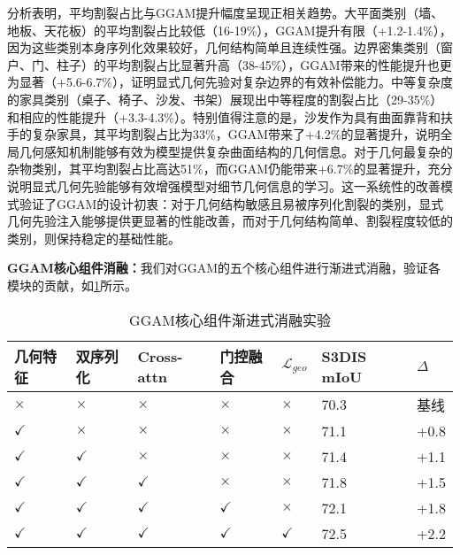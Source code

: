 \documentclass[preprint,12pt]{elsarticle}
\begin{document}
分析表明，平均割裂占比与GGAM提升幅度呈现正相关趋势。大平面类别（墙、地板、天花板）的平均割裂占比较低（16-19\%），GGAM提升有限（+1.2-1.4\%），因为这些类别本身序列化效果较好，几何结构简单且连续性强。边界密集类别（窗户、门、柱子）的平均割裂占比显著升高（38-45\%），GGAM带来的性能提升也更为显著（+5.6-6.7\%），证明显式几何先验对复杂边界的有效补偿能力。中等复杂度的家具类别（桌子、椅子、沙发、书架）展现出中等程度的割裂占比（29-35\%）和相应的性能提升（+3.3-4.3\%）。特别值得注意的是，沙发作为具有曲面靠背和扶手的复杂家具，其平均割裂占比为33\%，GGAM带来了+4.2\%的显著提升，说明全局几何感知机制能够有效为模型提供复杂曲面结构的几何信息。对于几何最复杂的杂物类别，其平均割裂占比高达51\%，而GGAM仍能带来+6.7\%的显著提升，充分说明显式几何先验能够有效增强模型对细节几何信息的学习。这一系统性的改善模式验证了GGAM的设计初衷：对于几何结构敏感且易被序列化割裂的类别，显式几何先验注入能够提供更显著的性能改善，而对于几何结构简单、割裂程度较低的类别，则保持稳定的基础性能。


\textbf{GGAM核心组件消融：}我们对GGAM的五个核心组件进行渐进式消融，验证各模块的贡献，如\cref{tab:ggam_full_ablation}所示。

\begin{table}[htbp!]
	\centering
	\caption{GGAM核心组件渐进式消融实验}
	\label{tab:ggam_full_ablation}
	\begin{tabular}{@{}lllllll@{}}
		\toprule
		几何特征 & 双序列化 & Cross-attn & 门控融合 & $\mathcal{L}_{geo}$ & S3DIS mIoU & $\Delta$ \\ 
		\midrule
		$\times$ & $\times$ & $\times$ & $\times$ & $\times$ & 70.3 & 基线 \\
		\midrule
		$\checkmark$ & $\times$ & $\times$ & $\times$ & $\times$ & 71.1 & +0.8 \\
		$\checkmark$ & $\checkmark$ & $\times$ & $\times$ & $\times$ & 71.4 & +1.1 \\
		$\checkmark$ & $\checkmark$ & $\checkmark$ & $\times$ & $\times$ & 71.8 & +1.5 \\
		$\checkmark$ & $\checkmark$ & $\checkmark$ & $\checkmark$ & $\times$ & 72.1 & +1.8 \\
		$\checkmark$ & $\checkmark$ & $\checkmark$ & $\checkmark$ & $\checkmark$ & 72.5 & +2.2 \\
		\bottomrule
	\end{tabular}
\end{table}
\end{document}
